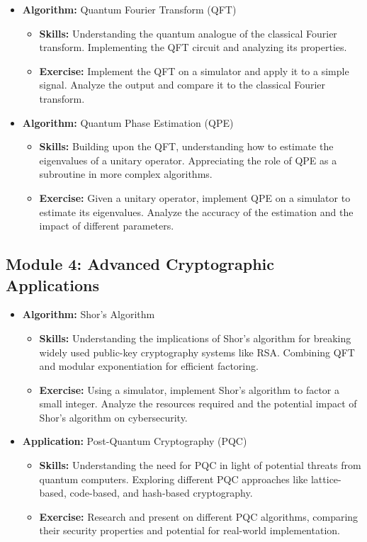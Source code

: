 \begin{itemize}
    \item \textbf{Algorithm:} Quantum Fourier Transform (QFT)
    \begin{itemize}
        \item \textbf{Skills:} Understanding the quantum analogue of the classical Fourier transform. Implementing the QFT circuit and analyzing its properties.
        \item \textbf{Exercise:} Implement the QFT on a simulator and apply it to a simple signal. Analyze the output and compare it to the classical Fourier transform.
    \end{itemize}
    
    \item \textbf{Algorithm:} Quantum Phase Estimation (QPE)
    \begin{itemize}
        \item \textbf{Skills:} Building upon the QFT, understanding how to estimate the eigenvalues of a unitary operator. Appreciating the role of QPE as a subroutine in more complex algorithms.
        \item \textbf{Exercise:} Given a unitary operator, implement QPE on a simulator to estimate its eigenvalues. Analyze the accuracy of the estimation and the impact of different parameters.
    \end{itemize}
\end{itemize}

\subsection{Module 4: Advanced Cryptographic Applications}

\begin{itemize}
    \item \textbf{Algorithm:} Shor's Algorithm
    \begin{itemize}
        \item \textbf{Skills:} Understanding the implications of Shor's algorithm for breaking widely used public-key cryptography systems like RSA. Combining QFT and modular exponentiation for efficient factoring.
        \item \textbf{Exercise:} Using a simulator, implement Shor's algorithm to factor a small integer. Analyze the resources required and the potential impact of Shor's algorithm on cybersecurity.
    \end{itemize}
    
    \item \textbf{Application:} Post-Quantum Cryptography (PQC)
    \begin{itemize}
        \item \textbf{Skills:} Understanding the need for PQC in light of potential threats from quantum computers. Exploring different PQC approaches like lattice-based, code-based, and hash-based cryptography.
        \item \textbf{Exercise:} Research and present on different PQC algorithms, comparing their security properties and potential for real-world implementation.
    \end{itemize}
\end{itemize}

